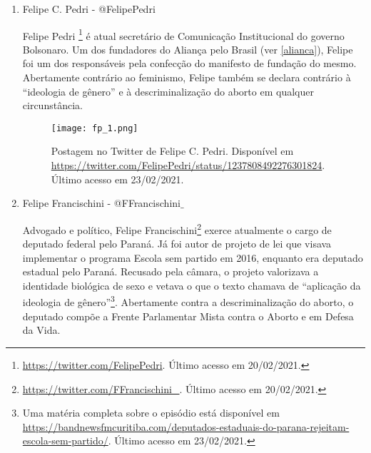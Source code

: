 \documentclass[
	12pt,				%
	openright,			%
	twoside,			%
	a4paper,			%
	english,			%
	brazil				%
	]{abntex2}
\begin{document}
\begin{anexosenv}
\begin{enumerate}
 Advogada especializada em Direito Tributário pela Pontifícia Universidade Católica de São Paulo (PUC-SP), consultora e membra do Articulação Conservadora, Iluminadas e Movimento Avança Brasil (ver \ref{mab}), Fabiana Barroso\footnote{\url{https://twitter.com/fabifbbr}. Último acesso em 20/02/2021.} também é \textit{youtuber} e comentarista política, com participação em jornais como Brasil Sem Medo (ver \ref{bsm}). Em suas redes sociais, já se posicionou contrariamente ou criticou a descriminalização do aborto, o feminismo, a ``ideologia de gênero'', e o ``kit gay'', além de se colocar favorável ao programa Escola sem partido.
 
 \begin{figure}[!htbp]
    \centering
    \texttt{[image: fb\_1.png]}
    \caption{Postagem no Twitter de Fabiana Barroso. Disponível em \url{https://twitter.com/fabifbbr/status/1044942826168090624}. Último acesso em 23/02/2021.}
 \end{figure}
 
 \item Felipe C. Pedri - @FelipePedri
 
 Felipe Pedri \footnote{\url{https://twitter.com/FelipePedri}. Último acesso em 20/02/2021.} é atual secretário de Comunicação Institucional do governo Bolsonaro. Um dos fundadores do Aliança pelo Brasil (ver \ref{alianca}), Felipe foi um dos responsáveis pela confecção do manifesto de fundação do mesmo. Abertamente contrário ao feminismo, Felipe também se declara contrário à ``ideologia de gênero'' e à descriminalização do aborto em qualquer circunstância.
 
 \begin{figure}[!htbp]
    \centering
    \texttt{[image: fp\_1.png]}
    \caption{Postagem no Twitter de Felipe C. Pedri. Disponível em \url{https://twitter.com/FelipePedri/status/1237808492276301824}. Último acesso em 23/02/2021.}
 \end{figure}
 
 \newpage
  
 \item Felipe Francischini - @FFrancischini$\_$
 
 Advogado e político, Felipe Francischini\footnote{\url{https://twitter.com/FFrancischini_}. Último acesso em 20/02/2021.} exerce atualmente o cargo de deputado federal pelo Paraná. Já foi autor de projeto de lei que visava implementar o programa Escola sem partido em 2016, enquanto era deputado estadual pelo Paraná. Recusado pela câmara, o projeto valorizava a identidade biológica de sexo e vetava o que o texto chamava de ``aplicação da ideologia de gênero''\footnote{Uma matéria completa sobre o episódio está disponível em \url{https://bandnewsfmcuritiba.com/deputados-estaduais-do-parana-rejeitam-escola-sem-partido/}. Último acesso em 23/02/2021.}. Abertamente contra a descriminalização do aborto, o deputado compõe a Frente Parlamentar Mista contra o Aborto e em Defesa da Vida.
  

\end{enumerate}
\end{anexosenv}
\end{document}
